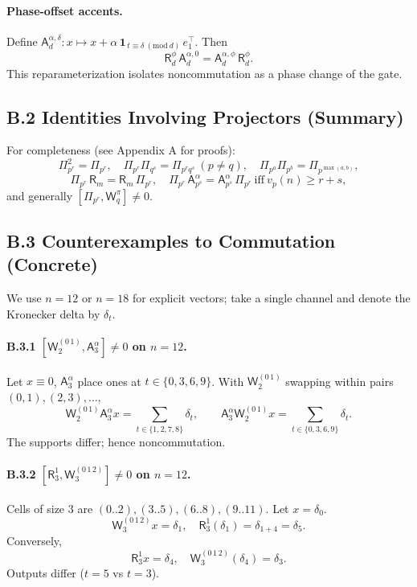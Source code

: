 \documentclass[12pt]{article}
\numberwithin{equation}{section}
\theoremstyle{plain}
\theoremstyle{definition}
\theoremstyle{remark}
\begin{document}
\paragraph{Phase-offset accents.}
Define $\mathsf{A}_{d}^{\alpha,\delta}:x\mapsto x+\alpha\,\mathbf{1}_{\,t\equiv \delta\ (\mathrm{mod}\ d)}\,e_1^\top$. Then
\[
\mathsf{R}_d^{\phi}\,\mathsf{A}_d^{\alpha,0}=\mathsf{A}_d^{\alpha,\phi}\,\mathsf{R}_d^{\phi}.
\]
This reparameterization isolates noncommutation as a phase change of the gate.

\subsection*{B.2 Identities Involving Projectors (Summary)}
For completeness (see Appendix A for proofs):
\[
\Pi_{p^r}^2=\Pi_{p^r},\quad \Pi_{p^r}\Pi_{q^s}=\Pi_{p^rq^s}\ (p\neq q),\quad \Pi_{p^a}\Pi_{p^b}=\Pi_{p^{\max(a,b)}},
\]
\[
\Pi_{p^r}\,\mathsf{R}_{m}=\mathsf{R}_{m}\,\Pi_{p^r},\quad
\Pi_{p^r}\,\mathsf{A}_{p^s}^{\alpha}=\mathsf{A}_{p^s}^{\alpha}\,\Pi_{p^r}\ \text{iff}\ v_p(n)\ge r+s,
\]
and generally $[\Pi_{p^r},\mathsf{W}_q^{\pi}]\neq 0$.

\subsection*{B.3 Counterexamples to Commutation (Concrete)}
We use $n=12$ or $n=18$ for explicit vectors; take a single channel and denote the Kronecker delta by $\delta_t$.

\paragraph{B.3.1 \([\mathsf{W}_2^{(0\,1)},\mathsf{A}_3^{\alpha}]\neq 0\) on $n=12$.}
Let $x\equiv 0$, $\mathsf{A}_3^{\alpha}$ place ones at $t\in\{0,3,6,9\}$. With $\mathsf{W}_2^{(0\,1)}$ swapping within pairs $(0,1),(2,3),\dots$,
\[
\mathsf{W}_2^{(0\,1)}\mathsf{A}_3^{\alpha}x=\sum_{t\in\{1,2,7,8\}}\delta_t,\qquad
\mathsf{A}_3^{\alpha}\mathsf{W}_2^{(0\,1)}x=\sum_{t\in\{0,3,6,9\}}\delta_t.
\]
The supports differ; hence noncommutation.

\paragraph{B.3.2 \([\mathsf{R}_{3}^{1},\mathsf{W}_3^{(0\,1\,2)}]\neq 0\) on $n=12$.}
Cells of size $3$ are $(0{..}2),(3{..}5),(6{..}8),(9{..}11)$. Let $x=\delta_0$.
\[
\mathsf{W}_3^{(0\,1\,2)}x=\delta_1,\quad \mathsf{R}_{3}^{1}(\delta_1)=\delta_{1+4}=\delta_5.
\]
Conversely,
\[
\mathsf{R}_{3}^{1}x=\delta_4,\quad \mathsf{W}_3^{(0\,1\,2)}(\delta_4)=\delta_3.
\]
Outputs differ ($t=5$ vs $t=3$).
\end{document}
